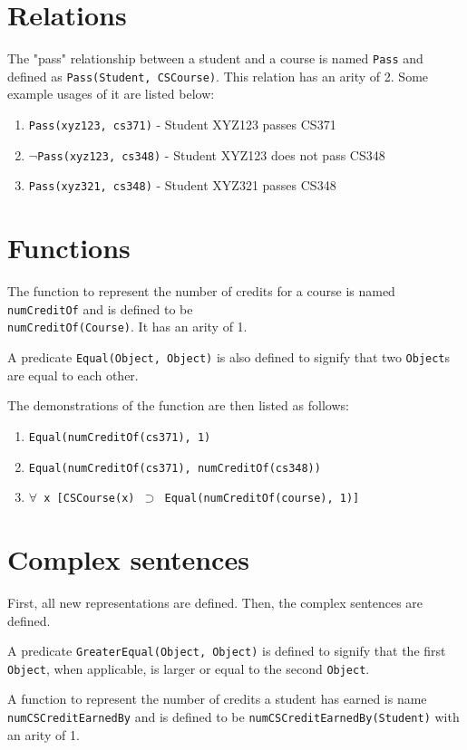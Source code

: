\documentclass[11pt]{article}
\begin{document}
\section{Relations}
The "pass" relationship between a student and a course is named \texttt{Pass} and defined as \texttt{Pass(Student, CSCourse)}. This relation has an arity of 2. Some example usages of it are listed below:
\begin{enumerate}
  \item \texttt{Pass(xyz123, cs371)} - Student XYZ123 passes CS371
  \item \texttt{$\neg$Pass(xyz123, cs348)} - Student XYZ123 does not pass CS348
  \item \texttt{Pass(xyz321, cs348)} - Student XYZ321 passes CS348
\end{enumerate} 

\section{Functions}
The function to represent the number of credits for a course is named \texttt{numCreditOf} and is defined to be \\ \texttt{numCreditOf(Course)}. It has an arity of 1.

A predicate \texttt{Equal(Object, Object)} is also defined to signify that two \texttt{Object}s are equal to each other.

The demonstrations of the function are then listed as follows:
\begin{enumerate}
  \item \texttt{Equal(numCreditOf(cs371), 1)}
  \item \texttt{Equal(numCreditOf(cs371), numCreditOf(cs348))}
  \item \texttt{$\forall$ x [CSCourse(x) $\supset$ Equal(numCreditOf(course), 1)]}
\end{enumerate}

\section{Complex sentences}
First, all new representations are defined. Then, the complex sentences are defined. 

A predicate \texttt{GreaterEqual(Object, Object)} is defined to signify that the first \texttt{Object}, when applicable, is larger or equal to the second \texttt{Object}.

A function to represent the number of credits a student has earned is name \texttt{numCSCreditEarnedBy} and is defined to be \texttt{numCSCreditEarnedBy(Student)} with an arity of 1.
\end{document}
